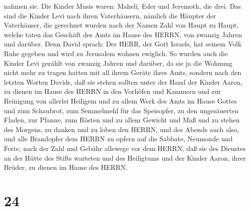 nahmen sie.  Die Kinder Musis waren: Maheli, Eder und
Jeremoth, die drei.  Das sind die Kinder Levi nach ihren
Vaterhäusern, nämlich die Häupter der Vaterhäuser, die gerechnet wurden
nach der Namen Zahl von Haupt zu Haupt, welche taten das Geschäft des
Amts im Hause des HERRN, von zwanzig Jahren und darüber. 
Denn David sprach: Der HERR, der Gott Israels, hat seinem Volk Ruhe
gegeben und wird zu Jerusalem wohnen ewiglich.  So wurden
auch die Kinder Levi gezählt von zwanzig Jahren und darüber, da sie ja
die Wohnung nicht mehr zu tragen hatten mit all ihrem Geräte ihres Amts,
 sondern nach den letzten Worten Davids,  daß
sie stehen sollten unter der Hand der Kinder Aaron, zu dienen im Hause
des HERRN in den Vorhöfen und Kammern und zur Reinigung von allerlei
Heiligem und zu allem Werk des Amts im Hause Gottes  und
zum Schaubrot, zum Semmelmehl für das Speisopfer, zu den ungesäuerten
Fladen, zur Pfanne, zum Rösten und zu allem Gewicht und Maß
 und zu stehen des Morgens, zu danken und zu loben den
HERRN, und des Abends auch also,  und alle Brandopfer dem
HERRN zu opfern auf die Sabbate, Neumonde und Feste, nach der Zahl und
Gebühr allewege vor dem HERRN,  daß sie des Dienstes an der
Hütte des Stifts warteten und des Heiligtums und der Kinder Aaron, ihrer
Brüder, zu dienen im Hause des HERRN.

\hypertarget{section-23}{%
\section{24}\label{section-23}}

